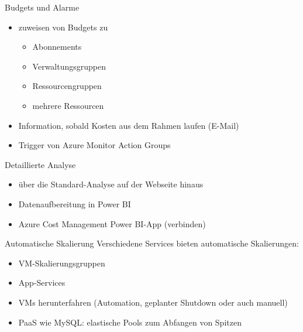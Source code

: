 \begin{flashcard}[Definition]{Budgets und Alarme}
  \begin{itemize}
    \item zuweisen von Budgets zu
      \begin{itemize}
        \item Abonnements
        \item Verwaltungsgruppen
        \item Ressourcengruppen
        \item mehrere Ressourcen
      \end{itemize}
    \item Information, sobald Kosten aus dem Rahmen laufen (E-Mail)
    \item Trigger von Azure Monitor Action Groups
  \end{itemize}
\end{flashcard}

\begin{flashcard}[Definition]{Detaillierte Analyse}
  \begin{itemize}
    \item über die Standard-Analyse auf der Webseite hinaus
    \item Datenaufbereitung in Power BI
    \item Azure Cost Management Power BI-App (verbinden)
  \end{itemize}
\end{flashcard}


\begin{flashcard}[Definition]{Automatische Skalierung}
  Verschiedene Services bieten automatische Skalierungen:
  \begin{itemize}
    \item VM-Skalierungsgruppen
    \item App-Services
    \item VMs herunterfahren (Automation, geplanter Shutdown oder auch manuell)
    \item PaaS wie MySQL: elastische Pools zum Abfangen von Spitzen
  \end{itemize}
\end{flashcard}

